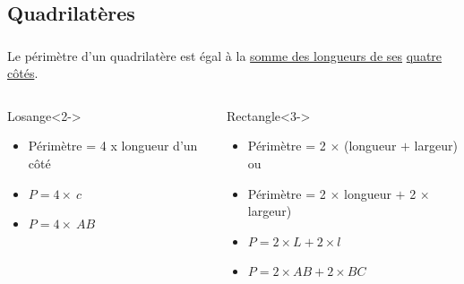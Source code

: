 \documentclass[xcolor=table]{beamer}
\begin{document}
\subsection{Quadrilatères}

\begin{frame}
	\frametitle{}  
	\framesubtitle{}	
	
	Le périmètre d'un quadrilatère est égal à la \underline{somme des longueurs de ses} \underline{quatre côtés}.
	
	
	
	\begin{columns}[onlytextwidth]
		\begin{column}{0.3\textwidth}
			\begin{alertblock}{Losange}<2->
				\begin{itemize}
					\item Périmètre = 4 x longueur d'un côté
					\item $P = 4 \times\ c$
					\item $P = 4 \times\ AB$
				\end{itemize}
				
			\end{alertblock}
		\end{column}
		\begin{column}{0.35\textwidth}
			\begin{alertblock}{Rectangle}<3->
				\begin{itemize}
					\item Périmètre = 2 $\times$ (longueur $+$ largeur) ou
					\item Périmètre = 2 $\times$ longueur $+$  2 $\times$ largeur)
					\item $P = 2 \times L + 2 \times l$
					\item $P = 2 \times AB + 2 \times BC$
				\end{itemize}
				

\end{alertblock}
\end{column}
\end{columns}
\end{frame}
\end{document}
